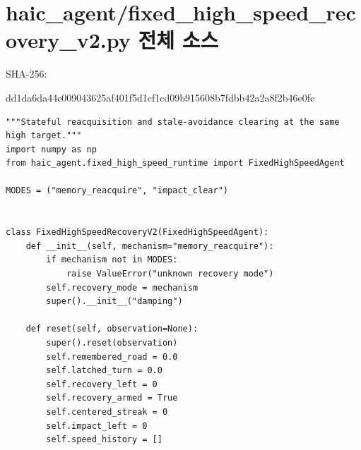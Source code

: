 \documentclass[11pt,a4paper]{article}
\begin{document}
\clearpage
\section{haic\_agent/fixed\_high\_speed\_recovery\_v2.py 전체 소스}
{\footnotesize SHA-256:\par\ttfamily dd1da6da44e009043625af401f5d1cf1cd09b915608b7fdbb42a2a8f2b46e0fc}
\begin{lstlisting}
"""Stateful reacquisition and stale-avoidance clearing at the same high target."""
import numpy as np
from haic_agent.fixed_high_speed_runtime import FixedHighSpeedAgent

MODES = ("memory_reacquire", "impact_clear")


class FixedHighSpeedRecoveryV2(FixedHighSpeedAgent):
    def __init__(self, mechanism="memory_reacquire"):
        if mechanism not in MODES:
            raise ValueError("unknown recovery mode")
        self.recovery_mode = mechanism
        super().__init__("damping")

    def reset(self, observation=None):
        super().reset(observation)
        self.remembered_road = 0.0
        self.latched_turn = 0.0
        self.recovery_left = 0
        self.recovery_armed = True
        self.centered_streak = 0
        self.impact_left = 0
        self.speed_history = []


\end{lstlisting}
\end{document}
